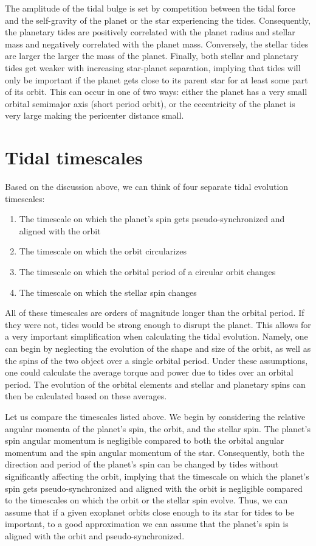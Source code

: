 The amplitude of the tidal bulge is set by competition between the tidal force
and the self-gravity of the planet or the star experiencing the tides.
Consequently, the planetary tides are positively correlated with the planet
radius and stellar mass and negatively correlated with the planet mass.
Conversely, the stellar tides are larger the larger the mass of the planet.
Finally, both stellar and planetary tides get weaker with increasing
star-planet separation, implying that tides will only be important if the planet
gets close to its parent star for at least some part of its orbit. This can
occur in one of two ways: either the planet has a very small orbital semimajor
axis (short period orbit), or the eccentricity of the planet is very large
making the pericenter distance small.

\section{Tidal timescales}

Based on the discussion above, we can think of four separate tidal evolution
timescales:

\begin{enumerate}
%
    \item The timescale on which the planet's spin gets pseudo-synchronized and
        aligned with the orbit
%
    \item The timescale on which the orbit circularizes
%
    \item The timescale on which the orbital period of a circular orbit changes
%
    \item The timescale on which the stellar spin changes
%
\end{enumerate}

All of these timescales are orders of magnitude longer than the orbital period.
If they were not, tides would be strong enough to disrupt the planet. This
allows for a very important simplification when calculating the tidal evolution.
Namely, one can begin by neglecting the evolution of the shape and size of the
orbit, as well as the spins of the two object over a single orbital period.
Under these assumptions, one could calculate the average torque and power due to
tides over an orbital period. The evolution of the orbital elements and stellar
and planetary spins can then be calculated based on these averages.

Let us compare the timescales listed above. We begin by considering the relative
angular momenta of the planet's spin, the orbit, and the stellar spin. The
planet's spin angular momentum is negligible compared to both the orbital
angular momentum and the spin angular momentum of the star.  Consequently, both
the direction and period of the planet's spin can be changed by tides without
significantly affecting the orbit, implying that the timescale on which the
planet's spin gets pseudo-synchronized and aligned with the orbit is negligible
compared to the timescales on which the orbit or the stellar spin evolve. Thus,
we can assume that if a given exoplanet orbits close enough to its star for
tides to be important, to a good approximation we can assume that the planet's
spin is aligned with the orbit and pseudo-synchronized.

